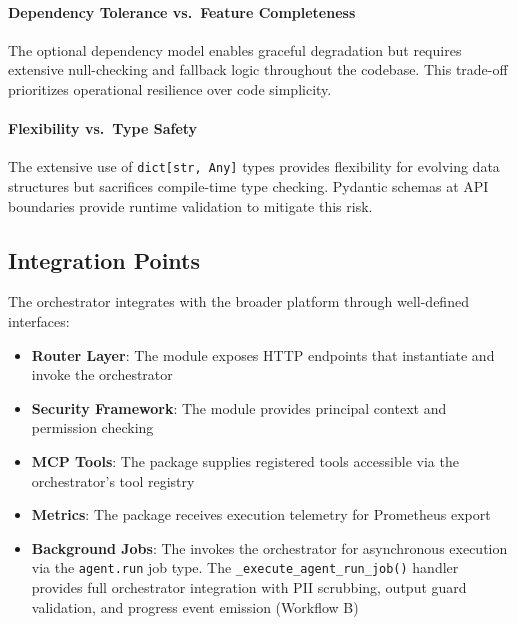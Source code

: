 \documentclass[a4paper,twoside]{sapthesis}
\begin{document}
\paragraph{Dependency Tolerance vs.\ Feature Completeness} The optional dependency model enables graceful degradation but requires extensive null-checking and fallback logic throughout the codebase. This trade-off prioritizes operational resilience over code simplicity.

\paragraph{Flexibility vs.\ Type Safety} The extensive use of \texttt{dict[str, Any]} types provides flexibility for evolving data structures but sacrifices compile-time type checking. Pydantic schemas at API boundaries provide runtime validation to mitigate this risk.

\subsection{Integration Points}

The orchestrator integrates with the broader platform through well-defined interfaces:

\begin{itemize}
    \item \textbf{Router Layer}: The  module exposes HTTP endpoints that instantiate and invoke the orchestrator
    
    \item \textbf{Security Framework}: The  module provides principal context and permission checking
    
    \item \textbf{MCP Tools}: The  package supplies registered tools accessible via the orchestrator's tool registry
    
    \item \textbf{Metrics}: The  package receives execution telemetry for Prometheus export
    
    \item \textbf{Background Jobs}: The  invokes the orchestrator for asynchronous execution via the \texttt{agent.run} job type. The \texttt{\_execute\_agent\_run\_job()} handler provides full orchestrator integration with PII scrubbing, output guard validation, and progress event emission (Workflow B)
\end{itemize}
\end{document}
